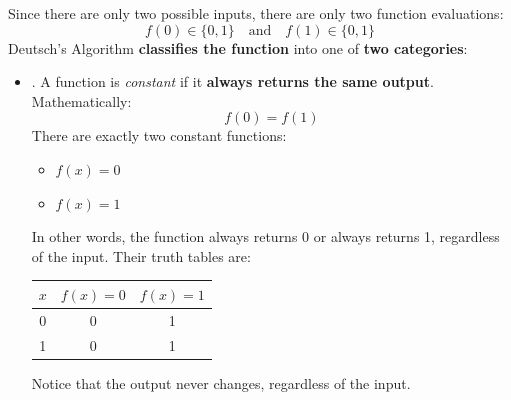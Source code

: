 \highspace
Since there are only two possible inputs, there are only two function evaluations:
\begin{equation*}
    f(0) \in \{0, 1\} \quad \text{and} \quad f(1) \in \{0, 1\}
\end{equation*}
Deutsch's Algorithm \textbf{classifies the function} into one of \textbf{two categories}:
\begin{itemize}
    \item {}. A function is \emph{constant} if it \textbf{always returns the same output}. Mathematically:
    \begin{equation*}
        f(0) = f(1)
    \end{equation*}
    There are exactly two constant functions:
    \begin{itemize}
        \item $f(x) = 0$
        \item $f(x) = 1$
    \end{itemize}
    In other words, the function always returns 0 or always returns 1, regardless of the input. Their truth tables are:
    \begin{center}
        \begin{tabular}{@{} c c c @{}}
            \toprule
            $x$ & $f(x)=0$ & $f(x)=1$ \\
            \midrule
            0 & 0 & 1 \\
            1 & 0 & 1 \\
            \bottomrule
        \end{tabular}
    \end{center}
    Notice that the output never changes, regardless of the input.



\end{itemize}
